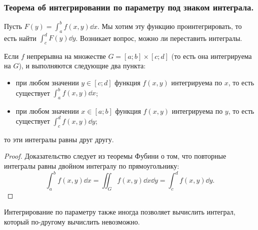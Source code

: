 \subsubsection{Теорема об интегрировании по параметру под знаком интеграла.}

Пусть $F(y) = \int_a^b f(x, y) \dd x$. Мы хотим эту функцию проинтегрировать, то есть найти $\int_c^d F(y) \dd y$. Возникает вопрос, можно ли переставить интегралы.

\begin{theorem*}
    Если $f$ непрерывна на множестве $G = [a; b] \times [c; d]$ (то есть она интегрируема на $G$), и выполняются следующие два пункта:
    \begin{itemize}
    \item 
        при любом значении $y \in [c; d]$ функция $f(x, y)$ интегрируема по $x$, то есть существует $\int_a^b f(x, y) \dd x$;

    \item 
        при любом значении $x \in [a; b]$ функция $f(x, y)$ интегрируема по $y$, то есть существует $\int_c^d f(x, y) \dd y$;
    \end{itemize}

    то эти интегралы равны друг другу.
\end{theorem*}

\begin{proof}
    Доказательство следует из теоремы Фубини о том, что повторные интегралы равны двойном интегралу по прямоугольнику:
    \begin{equation*}
        \int_a^b f(x, y) \dd x
        = \iint_G f(x, y) \dd x \dd y
        = \int_c^d f(x, y) \dd y.
    \end{equation*}
\end{proof}

Интегрирование по параметру также иногда позволяет вычислить интеграл, который по-другому вычислить невозможно.